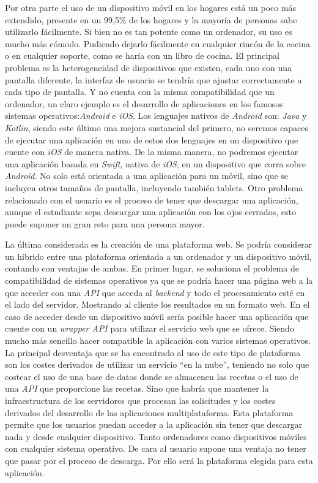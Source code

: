 Por otra parte el uso de un dispositivo móvil en los hogares está un poco más extendido, presente en un 99,5\% de los hogares y la mayoría de personas sabe utilizarlo fácilmente.\cite{ontsi2022} Si bien no es tan potente como un ordenador, su uso es mucho más cómodo. Pudiendo dejarlo fácilmente en cualquier rincón de la cocina o en cualquier soporte, como se haría con un libro de cocina. El principal problema es la heterogeneidad de dispositivos que existen, cada uno con una pantalla diferente, la interfaz de usuario se tendría que ajustar correctamente a cada tipo de pantalla. Y no cuenta con la misma compatibilidad que un ordenador, un claro ejemplo es el desarrollo de aplicaciones en los famosos sistemas operativos:\emph{Android} e \emph{iOS}. Los lenguajes nativos de \emph{Android} son: \emph{Java} y \emph{Kotlin}, siendo este último una mejora sustancial del primero, no seremos capaces de ejecutar una aplicación en uno de estos dos lenguajes en un dispositivo que cuente con \emph{iOS} de manera nativa. De la misma manera, no podremos ejecutar una aplicación basada en \emph{Swift}, nativa de \emph{iOS}, en un dispositivo que corra sobre \emph{Android}. No solo está orientada a una aplicación para un móvil, sino que se incluyen otros tamaños de pantalla, incluyendo también tablets. Otro problema relacionado con el usuario es el proceso de tener que descargar una aplicación, aunque el estudiante sepa descargar una aplicación con los ojos cerrados, esto puede suponer un gran reto para una persona mayor.

La última considerada es la creación de una plataforma web. Se podría considerar un híbrido entre una plataforma orientada a un ordenador y un dispositivo móvil, contando con ventajas de ambas. En primer lugar, se soluciona el problema de compatibilidad de sistemas operativos ya que se podría hacer una página web a la que acceder con una \emph{API} que acceda al \emph{backend} y todo el procesamiento esté en el lado del servidor. Mostrando al cliente los resultados en un formato web. En el caso de acceder desde un dispositivo móvil sería posible hacer una aplicación que cuente con un \emph{wrapper API} para utilizar el servicio web que se ofrece. Siendo mucho más sencillo hacer compatible la aplicación con varios sistemas operativos. La principal desventaja que se ha encontrado al uso de este tipo de plataforma son los costes derivados de utilizar un servicio ``en la nube'', teniendo no solo que costear el uso de una base de datos donde se almacenen las recetas o el uso de una \emph{API} que proporcione las recetas. Sino que habría que mantener la infraestructura de los servidores que procesan las solicitudes y los costes derivados del desarrollo de las aplicaciones multiplataforma. Esta plataforma permite que los usuarios puedan acceder a la aplicación sin tener que descargar nada y desde cualquier dispositivo. Tanto ordenadores como dispositivos móviles con cualquier sistema operativo. De cara al usuario supone una ventaja no tener que pasar por el proceso de descarga. Por ello será la plataforma elegida para esta aplicación.